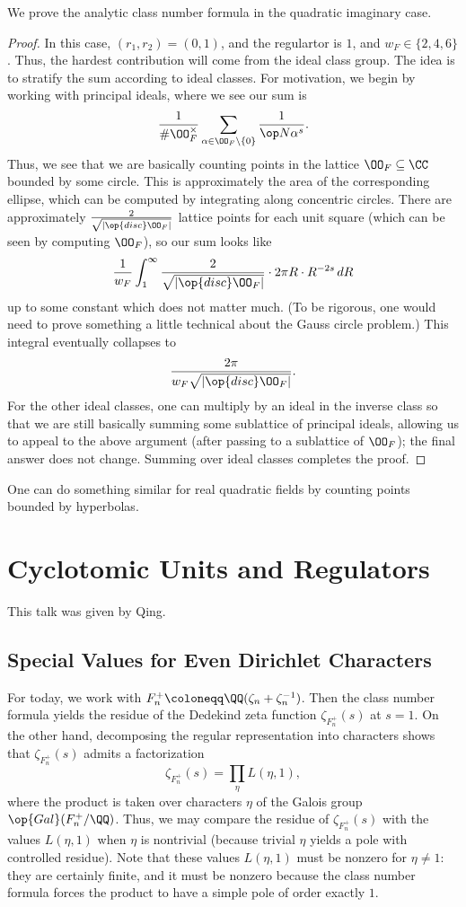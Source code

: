 \documentclass{article}
\begin{document}
\begin{proposition}
	We prove the analytic class number formula in the quadratic imaginary case.
\end{proposition}
\begin{proof}
	In this case, $(r_1,r_2)=(0,1)$, and the regulartor is $1$, and $w_F\in\{2,4,6\}$. Thus, the hardest contribution will come from the ideal class group. The idea is to stratify the sum according to ideal classes. For motivation, we begin by working with principal ideals, where we see our sum is
	\[\frac1{\#\OO_F^\times}\sum_{\alpha\in\OO_F\setminus\{0\}}\frac1{\op N\alpha^s}.\]
	Thus, we see that we are basically counting points in the lattice $\OO_F\subseteq\CC$ bounded by some circle. This is approximately the area of the corresponding ellipse, which can be computed by integrating along concentric circles. There are approximately $\frac2{\sqrt{\left|\op{disc}\OO_F\right|}}$ lattice points for each unit square (which can be seen by computing $\OO_F$), so our sum looks like
	\[\frac1{w_F}\int_1^\infty\frac2{\sqrt{\left|\op{disc}\OO_F\right|}}\cdot2\pi R\cdot R^{-2s}\,dR\]
	up to some constant which does not matter much. (To be rigorous, one would need to prove something a little technical about the Gauss circle problem.) This integral eventually collapses to
	\[\frac{2\pi}{w_F\sqrt{\left|\op{disc}\OO_F\right|}}.\]
	For the other ideal classes, one can multiply by an ideal in the inverse class so that we are still basically summing some sublattice of principal ideals, allowing us to appeal to the above argument (after passing to a sublattice of $\OO_F$); the final answer does not change. Summing over ideal classes completes the proof.
\end{proof}
\begin{remark}
	One can do something similar for real quadratic fields by counting points bounded by hyperbolas.
\end{remark}

\section{Cyclotomic Units and Regulators}
This talk was given by Qing.

\subsection{Special Values for Even Dirichlet Characters}
For today, we work with $F_n^+\coloneqq\QQ(\zeta_n+\zeta_n^{-1})$. Then the class number formula yields the residue of the Dedekind zeta function $\zeta_{F_n^+}(s)$ at $s=1$. On the other hand, decomposing the regular representation into characters shows that $\zeta_{F_n^+}(s)$ admits a factorization
\[\zeta_{F_n^+}(s)=\prod_\eta L(\eta,1),\]
where the product is taken over characters $\eta$ of the Galois group $\op{Gal}(F_n^+/\QQ)$. Thus, we may compare the residue of $\zeta_{F_n^+}(s)$ with the values $L(\eta,1)$ when $\eta$ is nontrivial (because trivial $\eta$ yields a pole with controlled residue). Note that these values $L(\eta,1)$ must be nonzero for $\eta\ne1$: they are certainly finite, and it must be nonzero because the class number formula forces the product to have a simple pole of order exactly $1$.
\end{document}
